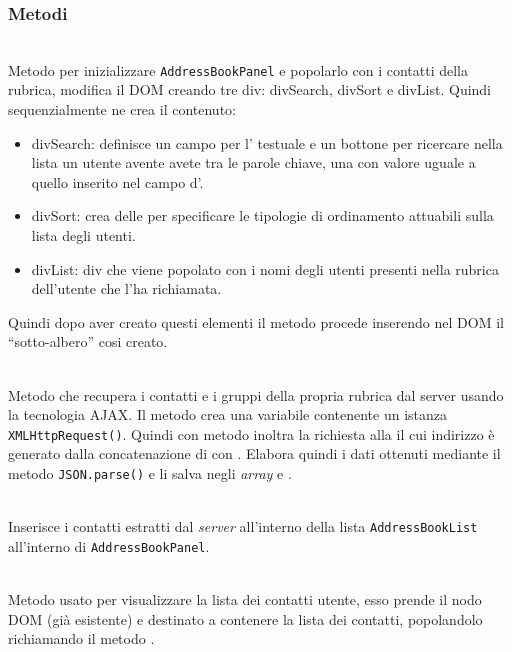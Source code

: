 \subsubsection*{Metodi}
\begin{description}	
	
	\item{}\\
	Metodo per inizializzare  \texttt{AddressBookPanel} e popolarlo con i contatti della rubrica, modifica il DOM creando tre div: divSearch, divSort e divList. Quindi sequenzialmente ne crea il contenuto:
		\begin{itemize}
			\item divSearch: definisce un campo per l' testuale e un bottone per ricercare nella lista un utente avente avete tra le parole chiave, una con valore uguale a quello inserito nel campo d'.
			\item divSort: crea delle  per specificare le tipologie di ordinamento attuabili sulla lista degli utenti.
			\item divList: div che viene popolato con i nomi degli utenti presenti nella rubrica dell'utente che l'ha richiamata.
		\end{itemize}

Quindi dopo aver creato questi elementi il metodo procede inserendo nel DOM il ``sotto-albero'' cosi creato.

	\item{}\\
Metodo che recupera i contatti e i gruppi della propria rubrica dal server usando la tecnologia AJAX. Il metodo crea una variabile contenente un istanza \texttt{XMLHttpRequest()}. Quindi con metodo  inoltra la richiesta alla  il cui indirizzo è generato dalla concatenazione di  con . Elabora quindi i dati ottenuti mediante il metodo \texttt{JSON.parse()} e li salva negli \textit{array}  e .
	
	\item{}\\
	Inserisce i contatti estratti dal \textit{server} all'interno della lista \texttt{AddressBookList} all'interno di \texttt{AddressBookPanel}.
	
	\item{}\\
	Metodo usato per visualizzare la lista dei contatti utente, esso prende il nodo DOM (già esistente) e destinato a contenere la lista dei contatti, popolandolo richiamando il metodo .
	

\end{description}
